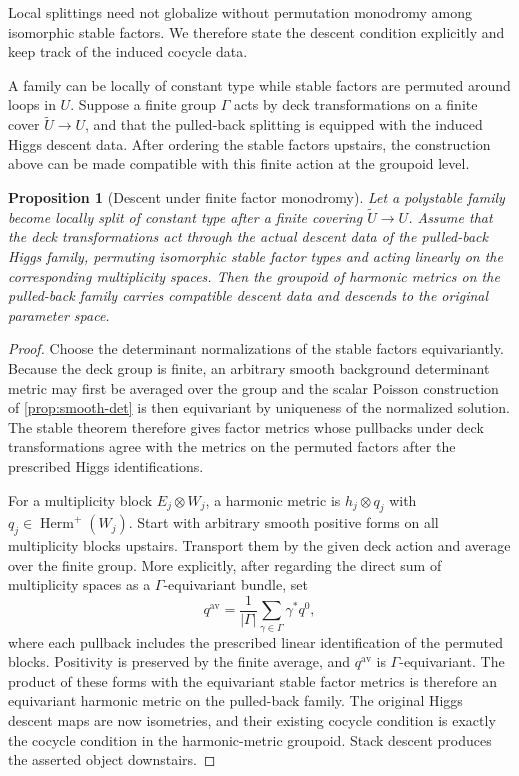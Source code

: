 \documentclass[11pt,reqno]{amsart}
\newtheorem{proposition}[theorem]{Proposition}
\theoremstyle{definition}
\theoremstyle{remark}
\newcommand{\Herm}{\operatorname{Herm}}
\begin{document}
Local splittings need not globalize without permutation monodromy among isomorphic stable factors.  We therefore state the descent condition explicitly and keep track of the induced cocycle data.


A family can be locally of constant type while stable factors are permuted around loops in $U$.  Suppose a finite group $\Gamma$ acts by deck transformations on a finite cover $\widetilde U\to U$, and that the pulled-back splitting is equipped with the induced Higgs descent data.  After ordering the stable factors upstairs, the construction above can be made compatible with this finite action at the groupoid level.

\begin{proposition}[Descent under finite factor monodromy]\label{prop:factor-monodromy}
Let a polystable family become locally split of constant type after a finite covering $\widetilde U\to U$.  Assume that the deck transformations act through the actual descent data of the pulled-back Higgs family, permuting isomorphic stable factor types and acting linearly on the corresponding multiplicity spaces.  Then the groupoid of harmonic metrics on the pulled-back family carries compatible descent data and descends to the original parameter space.
\end{proposition}

\begin{proof}
Choose the determinant normalizations of the stable factors equivariantly.  Because the deck group is finite, an arbitrary smooth background determinant metric may first be averaged over the group and the scalar Poisson construction of \cref{prop:smooth-det} is then equivariant by uniqueness of the normalized solution.  The stable theorem therefore gives factor metrics whose pullbacks under deck transformations agree with the metrics on the permuted factors after the prescribed Higgs identifications.

For a multiplicity block $E_j\otimes W_j$, a harmonic metric is
$h_j\otimes q_j$ with $q_j\in\Herm^+(W_j)$.  Start with arbitrary
smooth positive forms on all multiplicity blocks upstairs.  Transport
them by the given deck action and average over the finite group.  More
explicitly, after regarding the direct sum of multiplicity spaces as a
$\Gamma$-equivariant bundle, set
\[
 q^{\mathrm{av}}=
 \frac1{|\Gamma|}\sum_{\gamma\in\Gamma}\gamma^*q^0,
\]
where each pullback includes the prescribed linear identification of
the permuted blocks.  Positivity is preserved by the finite average,
and $q^{\mathrm{av}}$ is $\Gamma$-equivariant.  The product of these
forms with the equivariant stable factor metrics is therefore an
equivariant harmonic metric on the pulled-back family.  The original
Higgs descent maps are now isometries, and their existing cocycle
condition is exactly the cocycle condition in the harmonic-metric
groupoid.  Stack descent produces the asserted object downstairs.
\end{proof}
\end{document}
